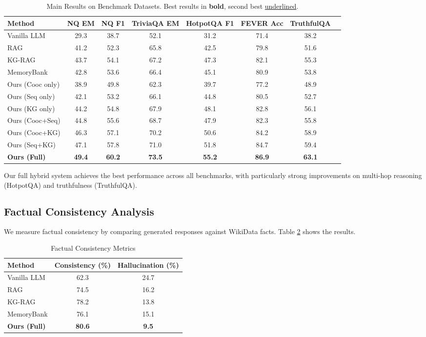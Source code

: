 \documentclass[conference]{IEEEtran}
\begin{document}
\begin{table}[t]
\centering
\caption{Main Results on Benchmark Datasets. Best results in \textbf{bold}, second best \underline{underlined}.}
\label{tab:main_results}
\begin{tabular}{lccccccc}
\toprule
\textbf{Method} & \textbf{NQ EM} & \textbf{NQ F1} & \textbf{TriviaQA EM} & \textbf{HotpotQA F1} & \textbf{FEVER Acc} & \textbf{TruthfulQA} \\
\midrule
Vanilla LLM & 29.3 & 38.7 & 52.1 & 31.2 & 71.4 & 38.2 \\
RAG & 41.2 & 52.3 & 65.8 & 42.5 & 79.8 & 51.6 \\
KG-RAG & 43.7 & 54.1 & 67.2 & 47.3 & 82.1 & 55.3 \\
MemoryBank & 42.8 & 53.6 & 66.4 & 45.1 & 80.9 & 53.8 \\
\midrule
Ours (Cooc only) & 38.9 & 49.8 & 62.3 & 39.7 & 77.2 & 48.9 \\
Ours (Seq only) & 42.1 & 53.2 & 66.1 & 44.8 & 80.5 & 52.7 \\
Ours (KG only) & 44.2 & 54.8 & 67.9 & 48.1 & 82.8 & 56.1 \\
Ours (Cooc+Seq) & 44.8 & 55.6 & 68.7 & 47.9 & 82.3 & 55.8 \\
Ours (Cooc+KG) & 46.3 & 57.1 & 70.2 & 50.6 & 84.2 & 58.9 \\
Ours (Seq+KG) & 47.1 & 57.8 & 71.0 & 51.8 & 84.7 & 59.4 \\
\textbf{Ours (Full)} & \textbf{49.4} & \textbf{60.2} & \textbf{73.5} & \textbf{55.2} & \textbf{86.9} & \textbf{63.1} \\
\bottomrule
\end{tabular}
\end{table}

Our full hybrid system achieves the best performance across all benchmarks, with particularly strong improvements on multi-hop reasoning (HotpotQA) and truthfulness (TruthfulQA).

\subsection{Factual Consistency Analysis}

We measure factual consistency by comparing generated responses against WikiData facts. Table \ref{tab:factual} shows the results.

\begin{table}[h]
\centering
\caption{Factual Consistency Metrics}
\label{tab:factual}
\begin{tabular}{lcc}
\toprule
\textbf{Method} & \textbf{Consistency (\%)} & \textbf{Hallucination (\%)} \\
\midrule
Vanilla LLM & 62.3 & 24.7 \\
RAG & 74.5 & 16.2 \\
KG-RAG & 78.2 & 13.8 \\
MemoryBank & 76.1 & 15.1 \\
\textbf{Ours (Full)} & \textbf{80.6} & \textbf{9.5} \\
\bottomrule
\end{tabular}
\end{table}
\end{document}
